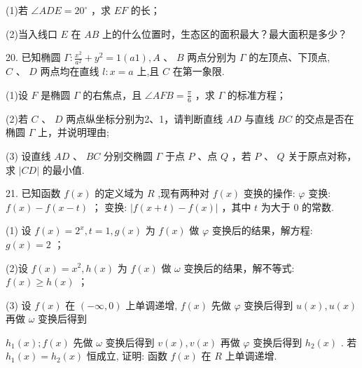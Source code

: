 \documentclass[10pt]{article}
\begin{document}
(1)若 \(\angle {ADE} = {20}^{ \circ  }\) ，求 \({EF}\) 的长；

(2)当入线口 \(E\) 在 \({AB}\) 上的什么位置时，生态区的面积最大？最大面积是多少？

20. 已知椭圆 \(\Gamma  : \frac{{x}^{2}}{{a}^{2}} + {y}^{2} = 1\left( {a1}\right) ,A\text{ 、 }B\) 两点分别为 \(\Gamma\) 的左顶点、下顶点, \(C\text{ 、 }D\) 两点均在直线 \(l : x = a\) 上,且 \(C\) 在第一象限.

(1)设 \(F\) 是椭圆 \(\Gamma\) 的右焦点，且 \(\angle {AFB} = \frac{\pi }{6}\) ，求 \(\Gamma\) 的标准方程；

(2)若 \(C\) 、 \(D\) 两点纵坐标分别为2、1，请判断直线 \({AD}\) 与直线 \({BC}\) 的交点是否在椭圆 \(\Gamma\) 上，并说明理由;

(3) 设直线 \({AD}\text{ 、 }{BC}\) 分别交椭圆 \(\Gamma\) 于点 \(P\) 、点 \(Q\) ，若 \(P\text{ 、 }Q\) 关于原点对称，求 \(\left| {CD}\right|\) 的最小值.

21. 已知函数 \(f\left( x\right)\) 的定义域为 \(R\) ,现有两种对 \(f\left( x\right)\) 变换的操作: \(\varphi\) 变换: \(f\left( x\right)  - f\left( {x - t}\right)\) ； 变换: \(\left| {f\left( {x + t}\right)  - f\left( x\right) }\right|\) ，其中 \(t\) 为大于 0 的常数.

(1) 设 \(f\left( x\right)  = {2}^{x},t = 1,g\left( x\right)\) 为 \(f\left( x\right)\) 做 \(\varphi\) 变换后的结果，解方程: \(g\left( x\right)  = 2\) ；

(2)设 \(f\left( x\right)  = {x}^{2},h\left( x\right)\) 为 \(f\left( x\right)\) 做 \(\omega\) 变换后的结果，解不等式: \(f\left( x\right)  \geq  h\left( x\right)\) ；

(3) 设 \(f\left( x\right)\) 在 \(\left( {-\infty ,0}\right)\) 上单调递增, \(f\left( x\right)\) 先做 \(\varphi\) 变换后得到 \(u\left( x\right) ,u\left( x\right)\) 再做 \(\omega\) 变换后得到

\({h}_{1}\left( x\right) ;f\left( x\right)\) 先做 \(\omega\) 变换后得到 \(v\left( x\right) ,v\left( x\right)\) 再做 \(\varphi\) 变换后得到 \({h}_{2}\left( x\right)\) . 若 \({h}_{1}\left( x\right)  = {h}_{2}\left( x\right)\) 恒成立, 证明: 函数 \(f\left( x\right)\) 在 \(R\) 上单调递增.
\end{document}

